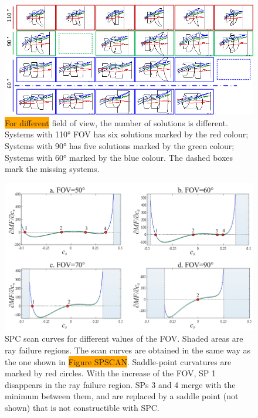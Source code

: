 \begin{figure}[h!]
    \centering
    \includegraphics[width=1.0\textwidth]{chapter-3/figures/FOVvarying.png}
    \caption{\colorbox{orange}{For different} field of view, the number of solutions is different. Systems with 110° FOV has six solutions marked by the red colour; Systems with 90° has five solutions marked by the green colour; Systems with 60° marked by the blue colour. The dashed boxes mark the missing systems.}
    \label{fig:FOVvarying}
\end{figure}

\begin{figure}[h!]
    \centering
    \includegraphics[width=1.0\textwidth]{chapter-3/figures/PhaseTransition_field.png}
    \caption{SPC scan curves for different values of the FOV. Shaded areas are ray failure regions. The scan curves are obtained in the same way as the one shown in \colorbox{orange}{Figure SPSCAN}. Saddle-point curvatures are marked by red circles. With the increase of the FOV, SP 1 disappears in the ray failure region. SPs 3 and 4 merge with the minimum between them, and are replaced by a saddle point (not shown) that is not constructible with SPC.}
    \label{fig:phasechange_field}
\end{figure}



